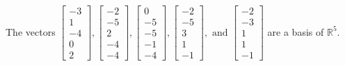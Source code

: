 \begin{exercise}
\begin{exerciseStatement}
  \end{exerciseStatement}
  \begin{exerciseAnswer}
   The vectors \(\left[\begin{array}{r}
-3 \\
1 \\
-4 \\
0 \\
2
\end{array}\right] , \left[\begin{array}{r}
-2 \\
-5 \\
2 \\
-4 \\
-4
\end{array}\right] , \left[\begin{array}{r}
0 \\
-5 \\
-5 \\
-1 \\
-4
\end{array}\right] , \left[\begin{array}{r}
-2 \\
-5 \\
3 \\
1 \\
-1
\end{array}\right] , \text{ and } \left[\begin{array}{r}
-2 \\
-3 \\
1 \\
1 \\
-1
\end{array}\right]\) 
  	 are  a basis of \(\mathbb{R}^5\).
  


  \end{exerciseAnswer}
\end{exercise}